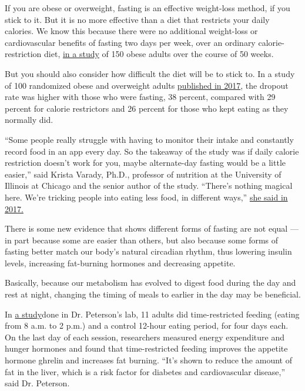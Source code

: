 If you are obese or overweight, fasting is an effective weight-loss
method, if you stick to it. But it is no more effective than a diet that
restricts your daily calories. We know this because there were no
additional weight-loss or cardiovascular benefits of fasting two days
per week, over an ordinary calorie-restriction diet,
\href{https://theconversation.com/intermittent-fasting-is-no-better-than-conventional-dieting-for-weight-loss-new-study-finds-107829}{in
a study} of 150 obese adults over the course of 50 weeks.

But you should also consider how difficult the diet will be to stick to.
In a study of 100 randomized obese and overweight adults
\href{https://jamanetwork.com/journals/jamainternalmedicine/fullarticle/2623528}{published
in 2017}, the dropout rate was higher with those who were fasting, 38
percent, compared with 29 percent for calorie restrictors and 26 percent
for those who kept eating as they normally did.

``Some people really struggle with having to monitor their intake and
constantly record food in an app every day. So the takeaway of the study
was if daily calorie restriction doesn't work for you, maybe
alternate-day fasting would be a little easier,'' said Krista Varady,
Ph.D., professor of nutrition at the University of Illinois at Chicago
and the senior author of the study. ``There's nothing magical here.
We're tricking people into eating less food, in different ways,''
\href{https://www.nytimes.com/2017/05/03/well/eat/fasting-offers-no-special-weight-loss-benefits.html}{she
said in 2017.}

There is some new evidence that shows different forms of fasting are not
equal --- in part because some are easier than others, but also because
some forms of fasting better match our body's natural circadian rhythm,
thus lowering insulin levels, increasing fat-burning hormones and
decreasing appetite.

Basically, because our metabolism has evolved to digest food during the
day and rest at night, changing the timing of meals to earlier in the
day may be beneficial.

In \href{https://www.ncbi.nlm.nih.gov/pubmed/31339000}{a study}done in
Dr. Peterson's lab, 11 adults did time-restricted feeding (eating from 8
a.m. to 2 p.m.) and a control 12-hour eating period, for four days each.
On the last day of each session, researchers measured energy expenditure
and hunger hormones and found that time-restricted feeding improves the
appetite hormone ghrelin and increases fat burning. ``It's shown to
reduce the amount of fat in the liver, which is a risk factor for
diabetes and cardiovascular disease,'' said Dr. Peterson.

